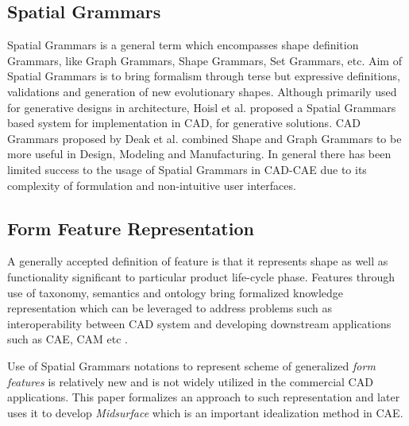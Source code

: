 \subsection{Spatial Grammars}

 Spatial Grammars is a general term which encompasses shape definition Grammars, like Graph Grammars, Shape Grammars, Set Grammars, etc. Aim of  Spatial Grammars is to bring formalism through terse but expressive definitions, validations and generation of new evolutionary shapes. Although primarily used for generative designs in architecture, Hoisl et al.\cite{Hoisl2012}  proposed a  Spatial Grammars based system for implementation in CAD, for generative solutions. CAD Grammars proposed by Deak et al.\cite{Deak2006} combined Shape and Graph Grammars to be more useful in Design, Modeling and Manufacturing. In general there has been limited success to the usage of Spatial Grammars in CAD-CAE due to its complexity of formulation and non-intuitive user interfaces.

\subsection{Form Feature Representation}

A generally accepted definition of feature is that  it represents shape as well as functionality significant to particular product life-cycle phase. Features through use of taxonomy, semantics and ontology  bring formalized knowledge representation which can be leveraged to address problems such as interoperability between CAD system and developing downstream applications such as CAE, CAM etc \cite{BidarraBronsvoort2000}.


Use of  Spatial Grammars notations to represent scheme of generalized {\em form features} is relatively new and is not widely utilized in the commercial CAD applications. This paper formalizes an approach to  such representation and later uses it to develop {\em Midsurface} which is an important idealization method in CAE.


